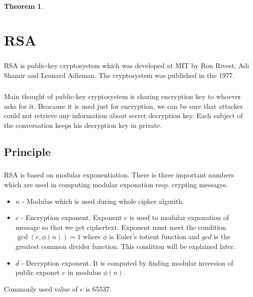 \documentclass[thesis=B,english]{FITthesis}[2012/10/20]
\newtheorem{theorem}{Theorem}
\begin{document}
{{\begin{theorem}
\end{theorem}




\chapter{RSA}

\paragraph*{}
{RSA is public-key cryptosystem which was developed at MIT by Ron Rivest, Adi Shamir and Leonard Adleman. The cryptosystem was published in the 1977.
}\cite{RSA-math}

\paragraph*{}{
Main thought of public-key cryptosystem is sharing encryption key to whoever asks for it. Beacause it is used just for encryption, we can be sure that attacker could not retrieve any information about secret decryption key. Each subject of the conversation keeps his decryption key in private.
}



\section{Principle}
\paragraph*{}
{RSA is based on modular exponentiation. There is three important numbers which are used in computing modular exponation resp. crypting messages.}
\begin{itemize}
 \item \(n\) - Modulus which is used during whole cipher algorith.
 \item \(e\) - Encryption exponent. Exponent \(e\) is used to modular exponation of message so that we get ciphertext. Exponent must meet the condition  \(\gcd(e,\phi(n)) = 1\) where \(\phi\) is Euler's totient function and \(gcd\) is the greatest common divider function. This condition will be explained later.
 \item \(d\) - Decryption exponent. It is computed by finding modular inversion of public exponet \(e\) in modulus \(\phi(n)\).
\end{itemize}
{Commonly used value of \(e\) is 65537.}
}}
\end{document}
